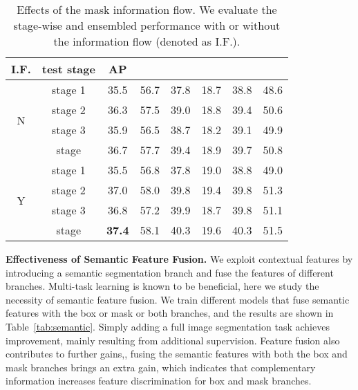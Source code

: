 \documentclass[10pt,twocolumn,letterpaper]{article}
\begin{document}
\begin{table}[htb]
	\centering
	\caption{Effects of the mask information flow. We evaluate the stage-wise and ensembled performance with or without the information flow (denoted as I.F.).}
	\addtolength{\tabcolsep}{-2pt}
	\begin{tabular}{*{8}{c}}
		\toprule
		I.F. & test stage & AP &  &  &  &  &  \\
		\midrule
		\multirow{4}{*}{N} & stage 1    & 35.5 & 56.7 & 37.8 & 18.7 & 38.8 & 48.6 \\
		       & stage 2    & 36.3 & 57.5 & 39.0 & 18.8 & 39.4 & 50.6 \\
		       & stage 3    & 35.9 & 56.5 & 38.7 & 18.2 & 39.1 & 49.9 \\
		       & stage  & 36.7 & 57.7 & 39.4 & 18.9 & 39.7 & 50.8 \\
		\midrule
		\multirow{4}{*}{Y} & stage 1    & 35.5 & 56.8 & 37.8 & 19.0 & 38.8 & 49.0 \\
		       & stage 2    & 37.0 & 58.0 & 39.8 & 19.4 & 39.8 & 51.3 \\
		       & stage 3    & 36.8 & 57.2 & 39.9 & 18.7 & 39.8 & 51.1 \\
		       & stage  & \textbf{37.4} & 58.1 & 40.3 & 19.6 & 40.3 & 51.5 \\
		\bottomrule
	\end{tabular}
	\label{tab:mask-info-stagewise}
\end{table}

\noindent\textbf{Effectiveness of Semantic Feature Fusion.}
We exploit contextual features by introducing a semantic segmentation branch and fuse the features of different branches.
Multi-task learning is known to be beneficial, here we study the necessity of semantic feature fusion.
We train different models that fuse semantic features with the box or mask or both branches,
and the results are shown in Table~\ref{tab:semantic}.
Simply adding a full image segmentation task achieves  improvement, mainly resulting from additional supervision.
Feature fusion also contributes to further gains,\eg, fusing the semantic features
with both the box and mask branches brings an extra  gain, which indicates that complementary information increases feature discrimination for box and mask branches.
\end{document}
